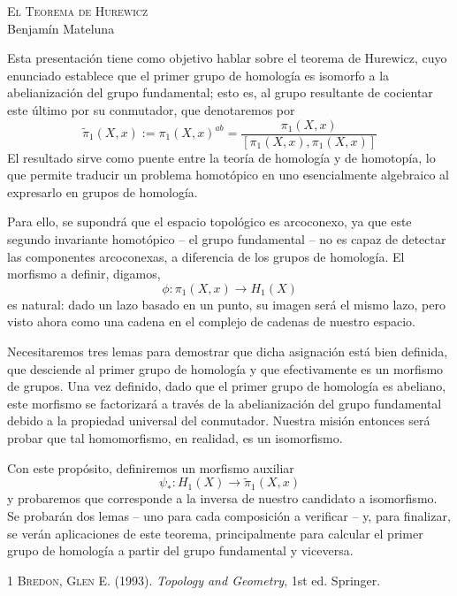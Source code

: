 \documentclass[11pt]{article}
\begin{document}
\begin{center}
    \Large\textsc{El Teorema de Hurewicz} \\
    \normalsize Benjamín Mateluna
\end{center}

\noindent Esta presentación tiene como objetivo hablar sobre el teorema de Hurewicz, cuyo 
enunciado establece que el primer grupo de homología es isomorfo a la abelianización del grupo 
fundamental; esto es, al grupo resultante de cocientar este último por su conmutador, que 
denotaremos por
\begin{equation*}
    \widetilde{\pi}_{1}(X,x):=\pi_{1}(X,x)^{ab}=\frac{\pi_{1}(X,x)}{[\pi_{1}(X,x),\pi_{1}(X,x)]}
\end{equation*}
\noindent El resultado sirve como puente entre la teoría de homología y de homotopía, lo que 
permite traducir un problema homotópico en uno esencialmente algebraico al expresarlo en grupos de 
homología.

\vspace{2mm}
\noindent Para ello, se supondrá que el espacio topológico es arcoconexo, ya que este segundo 
invariante homotópico -- el grupo fundamental -- no es capaz de detectar las componentes 
arcoconexas, a diferencia de los grupos de homología. El morfismo a definir, digamos,
\begin{equation*}
    \phi:\pi_{1}(X,x)\to H_{1}(X)
\end{equation*}
es natural: dado un lazo basado en un punto, su imagen será el mismo lazo, pero visto ahora como 
una cadena en el complejo de cadenas de nuestro espacio.

\vspace{2mm}
\noindent Necesitaremos tres lemas para demostrar que dicha asignación está bien definida, que 
desciende al primer grupo de homología y que efectivamente es un morfismo de grupos. Una vez 
definido, dado que el primer grupo de homología es abeliano, este morfismo se factorizará a través 
de la abelianización del grupo fundamental debido a la propiedad universal del conmutador. Nuestra 
misión entonces será probar que tal homomorfismo, en realidad, es un isomorfismo.

\vspace{2mm}
\noindent Con este propósito, definiremos un morfismo auxiliar
\begin{equation*}
    \psi_{*}:H_{1}(X)\to\widetilde{\pi}_{1}(X,x)
\end{equation*}
\noindent y probaremos que corresponde a la inversa de nuestro candidato a isomorfismo. Se 
probarán dos lemas -- uno para cada composición a verificar -- y, para finalizar, se verán 
aplicaciones de este teorema, principalmente para calcular el primer grupo de homología a partir 
del grupo fundamental y viceversa.

\begin{thebibliography}{1}
        \textsc{Bredon, Glen E.} (1993). 
        \textit{Topology and Geometry}, 1st ed. Springer.
\end{thebibliography}
\end{document}
